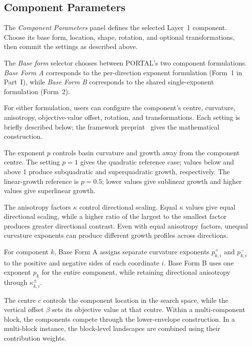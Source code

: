 \documentclass[journal,onecolumn]{IEEEtran}
\begin{document}
\subsection{Component Parameters}
\label{ssec:manual:generator-parameters}

The \emph{Component Parameters} panel defines the selected Layer~1 component. Choose its base form, location, shape, rotation, and optional transformations, then commit the settings as described above.

The \emph{Base form} selector chooses between PORTAL's two component formulations. \emph{Base Form A} corresponds to the per-direction exponent formulation (Form~1 in Part~I), while \emph{Base Form B} corresponds to the shared single-exponent formulation (Form~2).

For either formulation, users can configure the component's centre, curvature, anisotropy, objective-value offset, rotation, and transformations. Each setting is briefly described below; the framework preprint~\cite{portal2025framework} gives the mathematical construction.

The exponent \(p\) controls basin curvature and growth away from the component centre. The setting \(p=1\) gives the quadratic reference case; values below and above 1 produce subquadratic and superquadratic growth, respectively. The linear-growth reference is $p=0.5$; lower values give sublinear growth and higher values give superlinear growth.

The anisotropy factors \(\kappa\) control directional scaling. Equal \(\kappa\) values give equal directional scaling, while a higher ratio of the largest to the smallest factor produces greater directional contrast. Even with equal anisotropy factors, unequal curvature exponents can produce different growth profiles across directions.

For component \(k\), Base Form A assigns separate curvature exponents \(p^+_{k,i}\) and \(p^-_{k,i}\) to the positive and negative sides of each coordinate \(i\). Base Form B uses one exponent \(p_k\) for the entire component, while retaining directional anisotropy through \(\kappa^\pm_{k,i}\).

The centre \(c\) controls the component location in the search space, while the vertical offset \(\beta\) sets its objective value at that centre. Within a multi-component block, the components compete through the lower-envelope construction. In a multi-block instance, the block-level landscapes are combined using their contribution weights.
\end{document}
